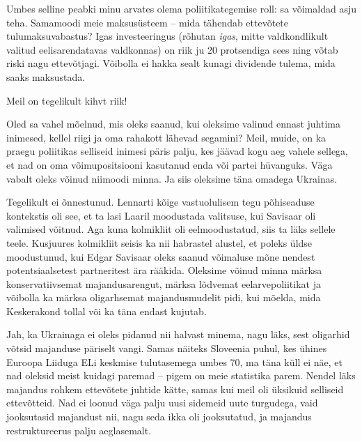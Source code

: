 Umbes selline peabki minu arvates olema poliitikategemise roll: sa 
võimaldad asju teha. Samamoodi meie maksusüsteem -- mida tähendab ettevõtete tulumaksuvabastus? Igas investeeringus (rõhutan \emph{igas}, mitte valdkondlikult valitud 
eelisarendatavas valdkonnas) on riik ju 20 protsendiga sees ning võtab 
riski nagu ettevõtjagi. Võibolla ei hakka sealt kunagi dividende tulema, mida 
saaks maksustada.

Meil on tegelikult kihvt riik!


Oled sa vahel mõelnud, mis oleks saanud, kui oleksime valinud ennast juhtima 
inimesed, kellel riigi ja oma rahakott lähevad segamini? Meil, muide, on ka 
praegu poliitikas selliseid inimesi päris palju, kes jäävad kogu aeg vahele 
sellega, et nad on oma võimupositsiooni kasutanud enda või partei 
hüvanguks. Väga vabalt oleks võinud niimoodi minna. Ja siis 
oleksime täna omadega Ukrainas.


Tegelikult ei õnnestunud. Lennarti kõige vastuolulisem tegu 
põhiseaduse kontekstis oli see, et ta lasi Laaril moodustada valitsuse, kui 
Savisaar oli valimised võitnud. Aga kuna kolmikliit oli eelmoodustatud, siis ta läks sellele teele. Kusjuures kolmikliit seisis ka nii habrastel alustel, et poleks üldse 
moodustunud, kui Edgar Savisaar oleks saanud 
võimaluse mõne nendest potentsiaalsetest partneritest ära rääkida. Oleksime võinud 
minna märksa konservatiivsemat majandusarengut, märksa lõdvemat eelarvepoliitikat ja võibolla ka märksa oligarhsemat majandusmudelit pidi, kui 
mõelda, mida Keskerakond tollal või ka täna endast kujutab.


Jah, ka Ukrainaga ei oleks pidanud nii halvast minema, nagu läks, sest
oligarhid võtsid majanduse päriselt vangi. Samas näiteks Sloveenia puhul, kes ühines Euroopa Liiduga ELi keskmise 
tulutasemega umbes 70, ma täna küll ei näe, et nad oleksid meist kuidagi 
paremad -- pigem on meie statistika parem. Nendel läks
majandus rohkem ettevõtete juhtide kätte, samas kui meil oli üksikuid 
selliseid ettevõtteid. Nad ei loonud väga palju uusi sidemeid uute turgudega, 
vaid jooksutasid majandust nii, nagu seda ikka oli jooksutatud, ja majandus 
restruktureerus palju aeglasemalt. 

